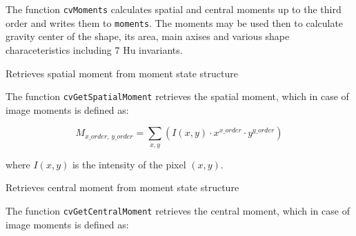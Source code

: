 The function \texttt{cvMoments} calculates spatial and central moments up to the third order and writes them to \texttt{moments}. The moments may be used then to calculate gravity center of the shape, its area, main axises and various shape characeteristics including 7 Hu invariants.

\label{GetSpatialMoment}

Retrieves spatial moment from moment state structure


\begin{description}
\end{description}

The function \texttt{cvGetSpatialMoment} retrieves the spatial moment, which in case of image moments is defined as:

\[
M_{x\_order, \, y\_order} = \sum_{x,y} (I(x,y) \cdot x^{x\_order} \cdot y^{y\_order})
\]

where $I(x,y)$ is the intensity of the pixel $(x, y)$.

\label{GetCentralMoment}

Retrieves central moment from moment state structure


\begin{description}
\end{description}

The function \texttt{cvGetCentralMoment} retrieves the central moment, which in case of image moments is defined as:

